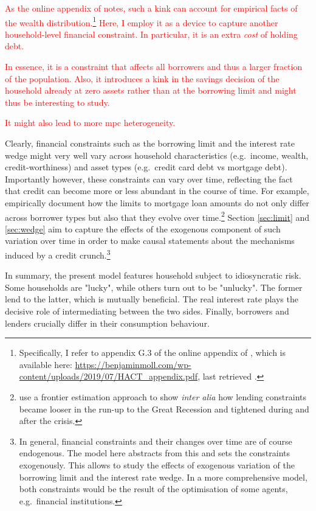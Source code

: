 \documentclass[12pt]{article} %
\numberwithin{equation}{section} %
\numberwithin{figure}{section}
\numberwithin{table}{section}
\begin{document}
\textcolor{red}{As the online appendix of \textcite{achdou2022} notes, such a kink can account for empirical facts of the wealth distribution.\footnote{Specifically, I refer to appendix G.3 of the online appendix of \textcite{achdou2022}, which is available here: \url{https://benjaminmoll.com/wp-content/uploads/2019/07/HACT_appendix.pdf}, last retrieved .} Here, I employ it as a device to capture another household-level financial constraint. In particular, it is an extra \textit{cost} of holding debt.}

\textcolor{red}{In essence, it is a constraint that affects all borrowers and thus a larger fraction of the population. Also, it introduces a kink in the savings decision of the household already at zero assets rather than at the borrowing limit and might thus be interesting to study.}

\textcolor{red}{It might also lead to more \Gls{mpc} heterogeneity.}

Clearly, financial constraints such as the borrowing limit and the interest rate wedge might very well vary across household characteristics (e.g.~income, wealth, credit-worthiness) and asset types (e.g.~credit card debt vs mortgage debt). Importantly however, these constraints can vary over time, reflecting the fact that credit can become more or less abundant in the course of time. For example, \textcite{anenberg2018} empirically document how the limits to mortgage loan amounts do not only differ across borrower types but also that they evolve over time.\footnote{\textcite{anenberg2018} use a frontier estimation approach to show \textit{inter alia} how lending constraints became looser in the run-up to the Great Recession and tightened during and after the crisis.} Section \ref{sec:limit} and \ref{sec:wedge} aim to capture the effects of the exogenous component of such variation over time in order to make causal statements about the mechanisms induced by a credit crunch.\footnote{In general, financial constraints and their changes over time are of course endogenous. The model here abstracts from this and sets the constraints exogenously. This allows to study the effects of exogenous variation of the borrowing limit and the interest rate wedge. In a more comprehensive model, both constraints would be the result of the optimisation of some agents, e.g.~financial institutions.}

In summary, the present model features household subject to idiosyncratic risk. Some households are "lucky", while others turn out to be "unlucky". The former lend to the latter, which is mutually beneficial. The real interest rate plays the decisive role of intermediating between the two sides. Finally, borrowers and lenders crucially differ in their consumption behaviour.
\end{document}
